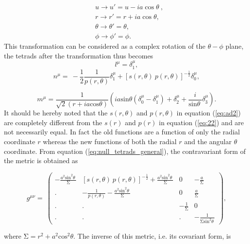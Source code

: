 \documentclass[12pt,a4paper,oneside]{book}
\newcommand{\eq}[2]{\begin{equation} \label{eq:#1} #2 \end{equation}}
\newcommand{\seq}[2]{\eq{#1}{\begin{split} #2 \end{split}}}
\newcommand{\Eref}[1]{(\ref{eq:#1})}
\begin{document}
\seq{}{
&u\to u'=u-ia \cos{\theta} \ ,
\\ &r\to r'=r+ia\cos{\theta},
\\ &\theta \to {\theta }'=\theta , 
\\&\phi \to {\phi }'=\phi.
}
This transformation can be considered as a complex rotation of the $\theta-\phi$ plane, the tetrads after the transformation thus becomes
\eq{}{l^{\mu }={\delta }^{\mu }_1,}
\eq{ad2}{n^{\mu }=\ -\frac{1}{2}\frac{1}{p\left(r,\theta \right)}{\delta }^{\mu }_1+{\left[s\left(r,\theta \right)\ p\left(r,\theta \right)\right]}^{-\frac{1}{2}}{\delta }^{\mu }_0,}

\eq{}{
	m^{\mu }=\frac{1}{\sqrt{2}\left(r+ia{\mathrm{cos} \theta }\right) }\left({ia{\mathrm{sin} \theta }\left(\delta ^{\mu }_0-{\delta }^{\mu }_1\right)+{\delta }^{\mu }_2+\frac{i}{{\mathrm{sin} \theta \ }}{\delta }^{\mu }_3}\right).
}
It should be hereby noted that the $s(r,\theta)$ and $p(r,\theta)$ in equation \Eref{ad2} are completely different from the $s(r)$ and $p(r)$ in equation \Eref{22} and are not necessarily equal. In fact the old functions are a function of only the radial coordinate $r$ whereas the new functions of both the radial $r$ and the angular $\theta$ coordinate.
From equation \Eref{null_tetrads_general}, the contravariant form of the metric is 
obtained as

\eq{}{g^{\mu \nu }=\ \left( \begin{array}{cccc}
-\frac{a^2{{\mathrm{sin}}^{\mathrm{2}} \theta \ }}{\mathrm{\Sigma }} & {\left[s\left(r,\theta \right)\ p\left(r,\theta \right)\right]}^{-\frac{1}{2}}+\frac{a^2{{\mathrm{sin}}^{\mathrm{2}} \theta \ }}{\mathrm{\Sigma }} & 0 & -\frac{a}{\mathrm{\Sigma }} \\ 
. & -\frac{1}{p\left(r,\theta \right)}-\frac{a^2{{\mathrm{sin}}^{\mathrm{2}} \theta \ }}{\mathrm{\Sigma }} & 0 & \frac{a}{\mathrm{\Sigma }} \\ 
. & . & -\frac{1}{\mathrm{\Sigma }} & 0 \\ 
. & . & . & -\frac{1}{\mathrm{\Sigma }{{\mathrm{sin}}^{\mathrm{2}} \theta \ }} \end{array}
\right),}

\noindent where $\mathrm{\Sigma }=r^2+a^2{\mathrm{cos}}^{\mathrm{2}} \theta$. The inverse of this metric, i.e. its covariant form, is
\end{document}
